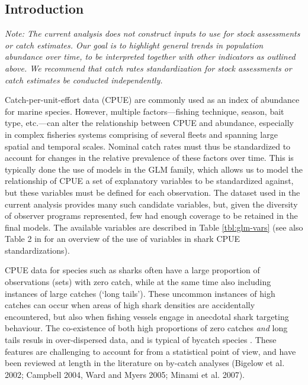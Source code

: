 \documentclass{SCreport}
\begin{document}

\subsection{Introduction}

\emph{Note: The current analysis does not construct inputs to use for stock assessments or catch estimates. Our goal is to highlight general trends in population abundance over time, to be interpreted together with other indicators as outlined above. We recommend that catch rates standardization for stock assessments or catch estimates be conducted independently.}


Catch-per-unit-effort data (CPUE) are commonly used as an index of abundance for marine species. However, multiple factors---fishing technique, season, bait type, etc.---can alter the relationship between CPUE and abundance, especially in complex fisheries systems comprising of several fleets and spanning large spatial and temporal scales. Nominal catch rates must thus be standardized to account for changes in the relative prevalence of these factors over time. This is typically done \via the use of models in the GLM family, which allows us to model the relationship of CPUE \vs a set of explanatory variables to be standardized against, but these variables must be defined for each observation. The dataset used in the current analysis provides many such candidate variables, but, given the diversity of observer programs represented, few had enough coverage to be retained in the final models. The available variables are described in Table \ref{tbl:glm-vars} (see also Table 2 in \citealt{Francis2014_a} for an overview of the use of variables in shark CPUE standardizations).

CPUE data for species such as sharks often have a large proportion of observations (sets) with zero catch, while at the same time also including instances of large catches (`long tails'). These uncommon instances of high catches can occur when areas of high shark densities are accidentally encountered, but also when fishing vessels engage in anecdotal shark targeting behaviour. The co-existence of both high proportions of zero catches \emph{and} long tails resuls in over-dispersed data, and is typical of bycatch species \citep{Ward2005_a}. These features are challenging to account for from a statistical point of view, and have been reviewed at length in the literature on by-catch analyses (Bigelow et al.  2002; Campbell  2004, Ward and Myers  2005; Minami et al. 2007).
\end{document}
